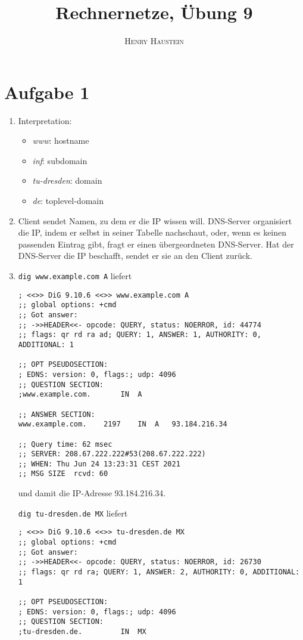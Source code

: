 \documentclass{article}
\title{\textbf{Rechnernetze, Übung 9}}
\author{\textsc{Henry Haustein}}
\date{}
\begin{document}
	\maketitle
	
	\section*{Aufgabe 1}
	\begin{enumerate}[label=(\alph*)]
		\item Interpretation:
		\begin{itemize}
			\item \textit{www}: hostname
			\item \textit{inf}: subdomain
			\item \textit{tu-dresden}: domain
			\item \textit{de}: toplevel-domain
		\end{itemize}
		\item Client sendet Namen, zu dem er die IP wissen will. DNS-Server organisiert die IP, indem er selbst in seiner Tabelle nachschaut, oder, wenn es keinen passenden Eintrag gibt, fragt er einen übergeordneten DNS-Server. Hat der DNS-Server die IP beschafft, sendet er sie an den Client zurück.
		\item \texttt{dig www.example.com A} liefert
		\begin{lstlisting}[tabsize=2]
; <<>> DiG 9.10.6 <<>> www.example.com A
;; global options: +cmd
;; Got answer:
;; ->>HEADER<<- opcode: QUERY, status: NOERROR, id: 44774
;; flags: qr rd ra ad; QUERY: 1, ANSWER: 1, AUTHORITY: 0, ADDITIONAL: 1

;; OPT PSEUDOSECTION:
; EDNS: version: 0, flags:; udp: 4096
;; QUESTION SECTION:
;www.example.com.		IN	A

;; ANSWER SECTION:
www.example.com.	2197	IN	A	93.184.216.34

;; Query time: 62 msec
;; SERVER: 208.67.222.222#53(208.67.222.222)
;; WHEN: Thu Jun 24 13:23:31 CEST 2021
;; MSG SIZE  rcvd: 60
		\end{lstlisting}
		und damit die IP-Adresse 93.184.216.34. 
		
		\texttt{dig tu-dresden.de MX} liefert
		\begin{lstlisting}[tabsize=2]
; <<>> DiG 9.10.6 <<>> tu-dresden.de MX
;; global options: +cmd
;; Got answer:
;; ->>HEADER<<- opcode: QUERY, status: NOERROR, id: 26730
;; flags: qr rd ra; QUERY: 1, ANSWER: 2, AUTHORITY: 0, ADDITIONAL: 1

;; OPT PSEUDOSECTION:
; EDNS: version: 0, flags:; udp: 4096
;; QUESTION SECTION:
;tu-dresden.de.			IN	MX


\end{lstlisting}
\end{enumerate}
\end{document}

